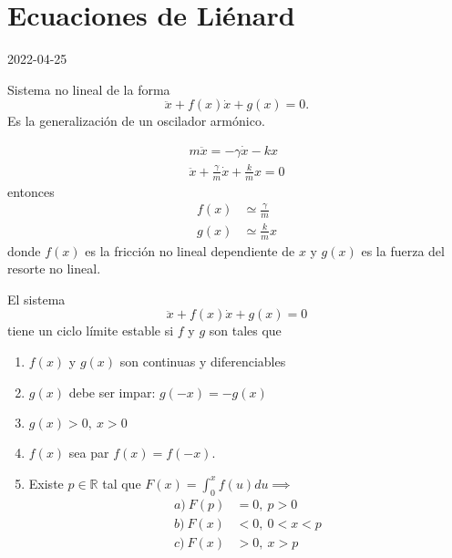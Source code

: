 \section{Ecuaciones de Liénard}

2022-04-25

\begin{tcolorbox}[colback=Black!4, colframe=White, arc=2mm]
\begin{definicion}
	Sistema no lineal de la forma
	$$
	\ddot{x} + f(x) \dot{x} + g(x) = 0 .
	$$
	Es la generalización de un oscilador armónico.
\end{definicion}
\end{tcolorbox}

\begin{tcolorbox}[colback=Black!4, colframe=White, arc=2mm]
\begin{recordatorio}
	\begin{gather*}
		m\ddot{x} = -\gamma\dot{x} - kx  \\
		\ddot{x} + \frac{\gamma}{m} \dot{x} + \frac{k}{m} x  = 0 
	\end{gather*}
	entonces \begin{align*}
		f(x) &\simeq \frac{\gamma}{m} \\
		g(x) &\simeq \frac{k}{m}x
	\end{align*}
	donde $f(x)$ es la fricción no lineal dependiente de  $x$ y  $g(x)$ es la fuerza del resorte no lineal.
\end{recordatorio}
\end{tcolorbox}
\begin{tcolorbox}[colback=Black!4,colframe=White, arc=2mm]
\begin{teorema}
	El sistema \begin{equation*}
	  \ddot{x} + f(x)\dot{x} + g(x) =0 
	\end{equation*}
	tiene un ciclo límite estable si $f$ y  $g$ son tales que
	 \begin{enumerate}
		\item $f(x)$ y  $g(x)$ son continuas y diferenciables
		\item $g(x)$ debe ser impar:  $g(-x)=-g(x)$ 
	  \item $g(x)>0,\ x>0$ 
		\item $f(x)$ sea par  $f(x)=f(-x)$. \\
		\item Existe $p \in \mathbb{R}$ tal que $F(x) = \int_{0}^{x} f(u) d{u} \implies$ \\
			$$	 
			\begin{aligned}
				   a) \ F(p) &= 0 ,\ p>0\\
					 b) \ F(x) &< 0 ,\ 0<x<p \\
					 c) \ F(x)&>0,\ x>p
			\end{aligned}
			$$
	\end{enumerate}
\end{teorema}
\end{tcolorbox}
